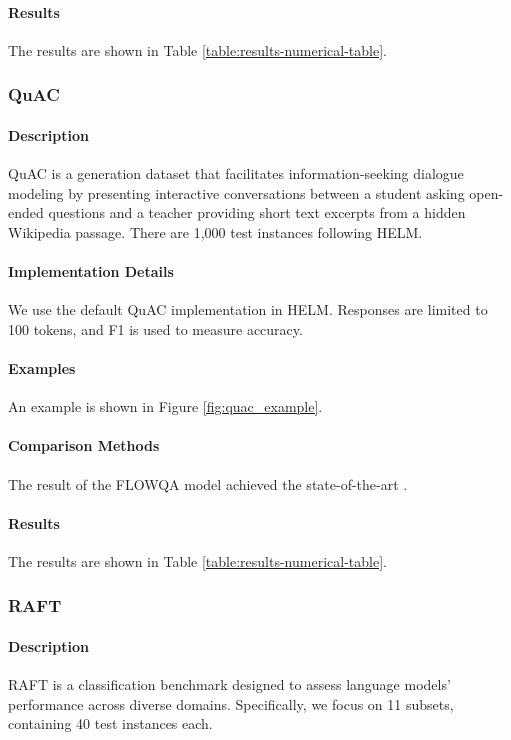\paragraph{Results} The results are shown in Table \ref{table:results-numerical-table}.

\subsubsection{QuAC}
\paragraph{Description} QuAC \citep{choi-etal-2018-quac} is a generation dataset that facilitates information-seeking dialogue modeling by presenting interactive conversations between a student asking open-ended questions and a teacher providing short text excerpts from a hidden Wikipedia passage. There are 1,000 test instances following HELM.

\paragraph{Implementation Details}
We use the default QuAC implementation in HELM. Responses are limited to 100 tokens, and F1 is used to measure accuracy.

\paragraph{Examples} An example is shown in Figure \ref{fig:quac_example}.

\paragraph{Comparison Methods}
The result of the FLOWQA model achieved the state-of-the-art \citep{huang2019flowqa}.

\paragraph{Results} The results are shown in Table \ref{table:results-numerical-table}.

\subsubsection{RAFT}
\paragraph{Description} RAFT \citep{alex2022raft} is a classification benchmark designed to assess language models' performance across diverse domains. Specifically, we focus on 11 subsets, containing 40 test instances each.

